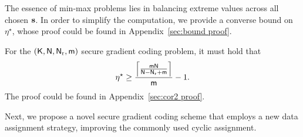 \documentclass[conference,letterpaper]{IEEEtran}
\begin{document}
The essence of min-max problems lies in balancing extreme values across all chosen ${\bf s}$. %
 In order to simplify the computation, we provide a converse bound on $\eta^{\star}$, whose proof could be found in Appendix~\ref{sec:bound proof}.

\begin{cor}
\label{cor:converse cor}
For the $({\sf K},{\sf N},{\sf N}_{\rm r}, {\sf m})$ secure gradient coding problem,
 it must hold that
\begin{align}
\eta^{\star} \geq \frac{\left\lceil  \frac{{\sf m}{\sf N}}{{\sf N}-{\sf N}_{\rm r}+{\sf m}} \right\rceil}{{\sf m}} -1. \label{eq:converse cor}
\end{align}
The proof could be found in Appendix~\ref{sec:cor2 proof}.
\end{cor} 
      


Next, we propose a novel secure gradient coding scheme that employs a new data assignment strategy, improving the commonly used cyclic assignment.
\end{document}
